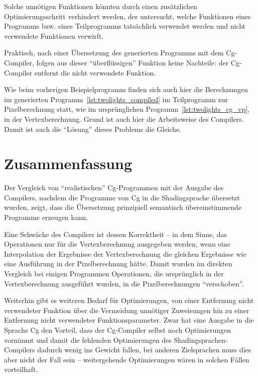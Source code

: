 \documentclass[twoside,a4paper,fleqn,12pt]{book}
\begin{document}
Solche unnötigen Funktionen könnten durch einen zusätzlichen Optimierungsschritt verhindert werden, der untersucht, welche
Funktionen eines Programms bzw. eines Teilprogramms tatsächlich verwendet werden und nicht verwendete Funktionen verwirft.

Praktisch, nach einer Übersetzung des generierten Programms mit dem Cg-Compiler, folgen aus dieser "`überflüssigen"' Funktion keine Nachteile:
der Cg-Compiler entfernt die nicht verwendete Funktion.

Wie beim vorherigen Beispielprogramm finden sich auch hier die Berechnungen im generierten Programm~\ref{lst:twolights_compiled} 
im Teilprogramm zur Pixelberechnung
statt, wie im ursprünglichen Programm~\ref{lst:twolights_cg_vp}, in der Vertexberechnung. Grund ist auch hier die Arbeitsweise des
Compilers. Damit ist auch die "`Lösung"' dieses Problems die Gleiche.

\section{Zusammenfassung}

Der Vergleich von "`realistischen"' Cg-Programmen mit der Ausgabe des Compilers, nachdem die Programme von Cg in die Shadingsprache
übersetzt wurden, zeigt, dass die Übersetzung prinzipiell semantisch übereinstimmende Programme erzeugen kann.

Eine Schwäche des Compilers ist dessen Korrektheit -- in dem Sinne, das Operationen nur für die Vertexberechnung ausgegeben werden,
wenn eine Interpolation der Ergebnisse der Vertexberechnung die gleichen Ergebnisse wie eine Ausführung in der Pixelberechnung hätte.
Damit wurden im direkten Vergleich bei einigen Programmen Operationen, die ursprünglich in der Vertexberechnung ausgeführt wurden,
in die Pixelberechnungen "`verschoben"'.

Weiterhin gibt es weiteren Bedarf für Optimierungen, von einer Entfernung nicht verwendeter Funktion über die Vermeidung unnötiger Zuweisungen
hin zu einer Entfernung nicht verwendeter Funktionsparameter. Zwar hat eine Ausgabe in die Sprache Cg den Vorteil, dass der
Cg-Compiler selbst noch Optimierungen vornimmt und damit die fehlenden Optimierungen des Shadingsprachen-Compilers dadurch wenig
ins Gewicht fallen, bei anderen Zielsprachen muss dies aber nicht der Fall sein -- weitergehende Optimierungen wären in solchen Fällen vorteilhaft.

\end{document}
